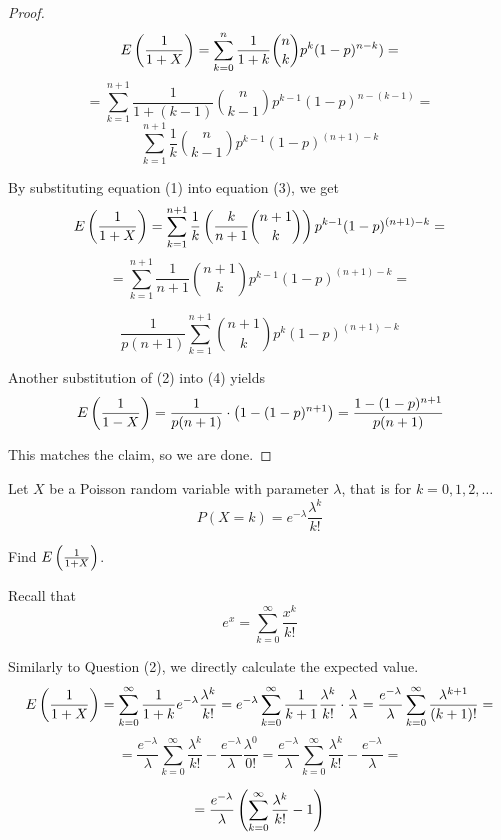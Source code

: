 \documentclass{exam}
\begin{document}
\begin{questions}
\begin{proof}
    $$E\left( \frac{1}{1 + X} \right) = \sum_{k = 0}^n \frac{1}{1 + k}\binom{n}{k}p^k(1 - p)^{n - k}) =$$
    $$= \sum_{k = 1}^{n + 1} \frac{1}{1 + (k - 1)}\binom{n}{k - 1}p^{k - 1}(1 - p)^{n - (k - 1)} =$$
    \begin{equation}
        \sum_{k = 1}^{n + 1} \frac{1}{k}\binom{n}{k - 1}p^{k - 1}(1 - p)^{(n + 1) - k}
    \end{equation}

    By substituting equation (1) into equation (3), we get
    $$E\left( \frac{1}{1 + X} \right) = \sum_{k = 1}^{n + 1} \frac{1}{k}\left( \frac{k}{n + 1}\binom{n + 1}{k} \right)p^{k - 1}(1 - p)^{(n + 1) - k} =$$
    $$= \sum_{k = 1}^{n + 1}\frac{1}{n + 1}\binom{n + 1}{k}p^{k - 1}(1 - p)^{(n + 1) - k} =$$

    \begin{equation}
        \frac{1}{p(n + 1)}\sum_{k = 1}^{n + 1}\binom{n + 1}{k}p^k(1 - p)^{(n + 1) - k}
    \end{equation}

    Another substitution of (2) into (4) yields
    $$E\left( \frac{1}{1 - X} \right) = \frac{1}{p(n + 1)} \cdot \left( 1 - (1 - p)^{n + 1} \right) = \frac{1 - (1 - p)^{n + 1}}{p(n + 1)}$$

    This matches the claim, so we are done.
\end{proof}

\newpage
\question
Let $X$ be a Poisson random variable with parameter $\lambda$, that is for $k = 0, 1, 2, \hdots$
$$P(X = k) = e^{-\lambda} \frac{\lambda^k}{k!}$$

Find $E\left( \frac{1}{1 + X} \right)$.

\sol
Recall that
\begin{equation}
    e^x = \sum_{k = 0}^\infty \frac{x^k}{k!}
\end{equation}

Similarly to Question (2), we directly calculate the expected value.
$$E\left( \frac{1}{1 + X} \right) = \sum_{k = 0}^\infty \frac{1}{1 + k} e^{-\lambda} \frac{\lambda^k}{k!} = e^{-\lambda} \sum_{k = 0}^\infty \frac{1}{k + 1}\frac{\lambda^k}{k!} \cdot \frac{\lambda}{\lambda} = \frac{e^{-\lambda}}{\lambda}\sum_{k = 0}^\infty \frac{\lambda^{k + 1}}{(k + 1)!} =$$
$$= \frac{e^{-\lambda}}{\lambda}\sum_{k = 0}^\infty \frac{\lambda^k}{k!} - \frac{e^{-\lambda}}{\lambda}\frac{\lambda^0}{0!} = \frac{e^{-\lambda}}{\lambda}\sum_{k = 0}^\infty \frac{\lambda^k}{k!} - \frac{e^{-\lambda}}{\lambda} =$$

\begin{equation}
    = \frac{e^{-\lambda}}{\lambda}\left( \sum_{k = 0}^\infty \frac{\lambda^k}{k!} - 1 \right)
\end{equation}


\end{questions}
\end{document}
